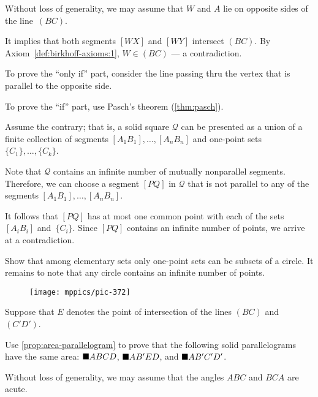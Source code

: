 Without  loss of generality, we may assume that $W$ and $A$ lie on opposite sides of the line~$(BC)$.

It implies that both segments $[WX]$ and $[WY]$ intersect $(BC)$.
By Axiom~\ref{def:birkhoff-axioms:1}, $W\in (BC)$ --- a contradiction.


To prove the ``only if'' part, consider the line passing thru the vertex that is parallel to the opposite side.

To prove the ``if'' part, use Pasch's theorem (\ref{thm:pasch}).

Assume the contrary; that is, a solid square $\mathcal{Q}$ can be presented as a union of a finite collection of segments $[A_1B_1],\dots,[A_nB_n]$
and one-point sets $\{C_1\},\dots,\{C_k\}$.

Note that $\mathcal{Q}$ contains an infinite number of mutually nonparallel segments.
Therefore, we can choose a segment $[PQ]$ in $\mathcal{Q}$ 
that is not parallel to any of the segments $[A_1B_1],\dots,[A_nB_n]$.

It follows that $[PQ]$ has at most one common point with each of the sets $[A_iB_i]$ and~$\{C_i\}$.
Since $[PQ]$ contains an infinite number of points, we arrive at a contradiction.

Show that among elementary sets
only one-point sets can be subsets of a circle.
It remains to note that any circle contains an infinite number of points.

\begin{wrapfigure}{r}{28mm}
\vskip-4mm
\centering
\texttt{[image: mppics/pic-372]}
\end{wrapfigure}

Suppose that $E$ denotes the point of intersection of the lines $(BC)$ and~$(C'D')$.

Use \ref{prop:area-parallelogram} to prove that the following solid parallelograms have the same area:
$\blacksquare ABCD$, $\blacksquare AB'ED$, and $\blacksquare AB'C'D'$.

Without loss of generality, we may assume that the angles $ABC$ and $BCA$ are acute.

